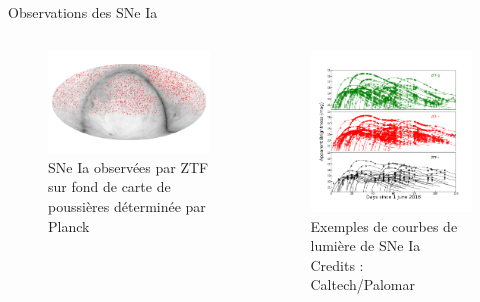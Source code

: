 \documentclass{beamer}
\newcommand{\credits}[1]{\tiny Credits : #1}
\begin{document}
\begin{frame}{Observations des SNe Ia}
\begin{columns}
\begin{column}{.5\textwidth}
\begin{figure}
	\centering
	\includegraphics[width=\textwidth]{figures/ztf_on_dust.png}
	\caption{SNe Ia observées par ZTF sur fond de carte de poussières déterminée par Planck}
\end{figure}
\end{column}
\begin{column}{.5\textwidth}
\begin{figure}
	\centering
	\includegraphics[width=\textwidth, trim={1cm 1cm 1cm 2cm}, clip]{figures/ZTF_lightcurves.png}
	\caption{Exemples de courbes de lumière de SNe Ia \\ \credits{Caltech/Palomar}}
\end{figure}
\end{column}
\end{columns}
\end{frame}
\end{document}
